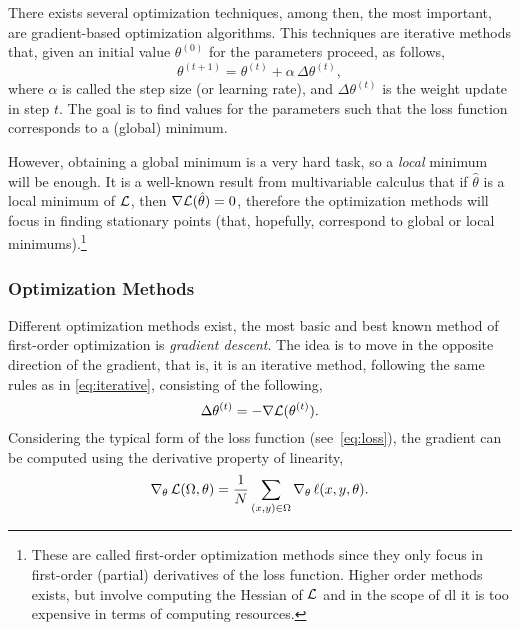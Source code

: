 There exists several optimization techniques, among then, the most important,
are gradient-based optimization algorithms. This techniques are iterative
methods that, given an initial value \(\theta^{(0)}\) for the parameters
proceed, as follows,
\begin{equation}\label{eq:iterative}
  \theta^{(t + 1)} = \theta^{(t)} + \alpha\,\Delta\theta^{(t)},
\end{equation}
where \(\alpha\) is called the step size (or learning rate), and
\(\Delta\theta^{(t)}\) is the weight update in step \(t\). The goal is to find
values for the parameters such that the loss function corresponds to a (global)
minimum.

However, obtaining a global minimum is a very hard task, so a \emph{local}
minimum will be enough. It is a well-known result from multivariable calculus
that if \(\hat{\theta}\) is a local minimum of \(\mathcal{L}\), then
\(\nabla\mathcal{L}(\hat{\theta}) = 0\), therefore the optimization methods will
focus in finding stationary points (that, hopefully, correspond to global or
local minimums).\footnote{These are called first-order optimization methods
  since they only focus in first-order (partial) derivatives of the loss
  function. Higher order methods exists, but involve computing the Hessian of
  \(\mathcal{L}\) and in the scope of \gls{dl} it is too expensive in terms of
  computing resources.}

\subsubsection{Optimization Methods}

Different optimization methods exist, the most basic and best known method of
first-order optimization is \emph{gradient descent}. The idea is to move in the
opposite direction of the gradient, that is, it is an iterative method,
following the same rules as in \vref{eq:iterative}, consisting of the following,
\begin{equation}\label{eq:gd}
  \Delta\theta^{(t)} = - \nabla\mathcal{L}(\theta^{(t)}).
\end{equation}
Considering the typical form of the loss function (see\ \vref{eq:loss}), the
gradient can be computed using the derivative property of linearity,
\begin{equation}\label{eq:nabla-loss}
  \nabla_{\theta}\,\mathcal{L}(\Omega, \theta) =
  \frac{1}{N} \sum_{(x, y) \in \Omega} \nabla_{\theta}\,\ell (x, y, \theta).
\end{equation}


